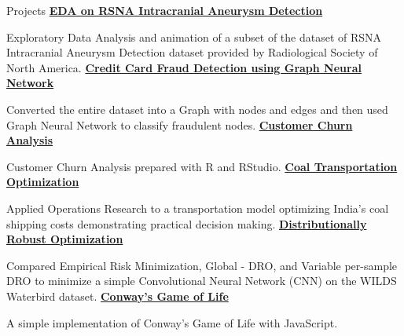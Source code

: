 
\begin{rubric}{Projects}
\entry*[]
    \textbf{\href{https://www.kaggle.com/code/aheersrabon/rsna-iad-doing-eda}{EDA on RSNA Intracranial Aneurysm Detection}}
    \par Exploratory Data Analysis and animation of a subset of the dataset of RSNA Intracranial Aneurysm Detection dataset provided by Radiological Society of North America.
\entry*[]
    \textbf{\href{https://www.kaggle.com/code/aheersrabon/fraud-detection-ieee-cis}{Credit Card Fraud Detection using Graph Neural Network}}
    \par Converted the entire dataset into a Graph with nodes and edges and then used Graph Neural Network to classify fraudulent nodes.
\entry*[]
    \textbf{\href{https://totalblank.github.io/Churn-Analysis/churn_analysis.html}{Customer Churn Analysis}}
	\par Customer Churn Analysis prepared with R and RStudio.
\entry*[]
    \textbf{\href{https://drive.google.com/file/d/1jfiUezMUgbju4wYpCKPOwV52DmndSEff/view?usp=sharing}{Coal Transportation Optimization}}
	\par Applied Operations Research to a transportation model optimizing India's coal shipping costs demonstrating practical decision making.
\entry*[]
    \textbf{\href{https://www.kaggle.com/code/aheersrabon/dro-waterbird}{Distributionally Robust Optimization}}
    \par Compared Empirical Risk Minimization, Global - DRO, and Variable per-sample DRO to minimize a simple Convolutional Neural Network (CNN)
    on the WILDS Waterbird dataset.
\entry*[]
    \textbf{\href{https://srabon-s-portfolio.vercel.app/portfolio/projects/game_of_life}{Conway's Game of Life}}
    \par A simple implementation of Conway's Game of Life with JavaScript.
\end{rubric}
